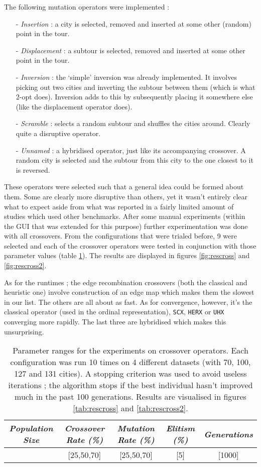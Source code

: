 The following mutation operators were implemented :
\begin{itemize}
\item[-] \textit{Insertion} : a city is selected, removed and inserted at some other (random) point in the tour.
\item[-] \textit{Displacement} : a subtour is selected, removed and inserted at some other point in the tour.
\item[-] \textit{Inversion} : the `simple' inversion was already implemented. It involves picking out two cities and inverting the subtour between them (which is what 2-opt does). Inversion adds to this by subsequently placing it somewhere else (like the displacement operator does).
\item[-] \textit{Scramble} : selects a random subtour and shuffles the cities around. Clearly quite a disruptive operator.
\item[-] \textit{Unnamed} : a hybridised operator, just like its accompanying crossover. A random city is selected and the subtour from this city to the one closest to it is reversed.
\end{itemize}
These operators were selected such that a general idea could be formed about them. Some are clearly more disruptive than others, yet it wasn't entirely clear what to expect aside from what was reported in a fairly limited amount of studies which used other benchmarks. After some manual experiments (within the GUI that was extended for this purpose) further experimentation was done with all crossovers. From the configurations that were trialed before, 9 were selected and each of the crossover operators were tested in conjunction with those parameter values (table \ref{tab:par2}). The results are displayed in figures \ref{fig:rescross} and \ref{fig:rescross2}.\\

\par\noindent As for the runtimes ; the edge recombination crossovers (both the classical and heuristic one) involve construction of an edge map which makes them the slowest in our list. The others are all about as fast. As for convergence, however, it's the classical operator (used in the ordinal representation), \texttt{SCX}, \texttt{HERX} or \texttt{UHX} converging more rapidly. The last three are hybridised which makes this unsurprising.

\begin{table}[h]
\centering
\begin{tabular}{c|c|c|c|c}
\textit{Population Size} & \textit{Crossover Rate (\%)} & \textit{Mutation Rate (\%)} & \textit{Elitism (\%)} & \textit{Generations} \\\hline 
[300] & [25,50,70] & [25,50,70] & [5] & [1000]
\end{tabular}
\caption{Parameter ranges for the experiments on crossover operators. Each configuration was run 10 times on 4 different datasets (with 70, 100, 127 and 131 cities). A stopping criterion was used to avoid useless iterations ; the algorithm stops if the best individual hasn't improved much in the past 100 generations. Results are visualised in figures \ref{tab:rescross} and \ref{tab:rescross2}.}
\label{tab:par2}
\end{table}

